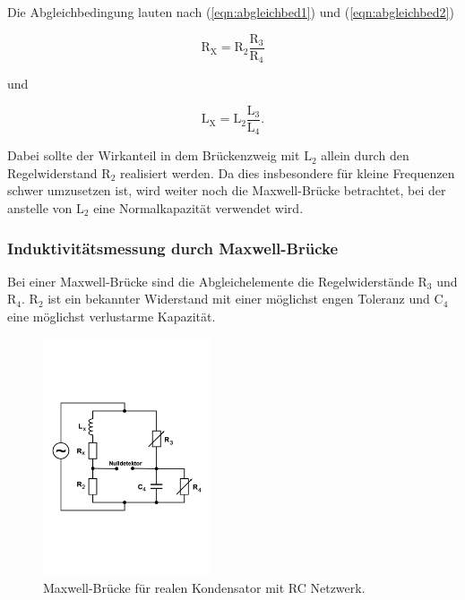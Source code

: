 \noindent
Die Abgleichbedingung lauten nach (\ref{eqn:abgleichbed1}) und (\ref{eqn:abgleichbed2})

\begin{equation}
\text{R}_\text{X} = \text{R}_2 \frac{\text{R}_3}{\text{R}_4}
\label{eqn:r_x}
\end{equation}

\noindent
und 

\begin{equation}
\text{L}_\text{X} = \text{L}_2 \frac{\text{L}_3}{\text{L}_4}  .
\label{eqn:l_x}
\end{equation}

\noindent
Dabei sollte der Wirkanteil in dem Brückenzweig mit $\text{L}_2$ allein durch den Regelwiderstand $\text{R}_2$ realisiert werden.
Da dies insbesondere für kleine Frequenzen schwer umzusetzen ist, wird weiter noch die Maxwell-Brücke betrachtet, 
bei der anstelle von $\text{L}_2$ eine Normalkapazität verwendet wird.

\subsubsection{Induktivitätsmessung durch Maxwell-Brücke}

\noindent
Bei einer Maxwell-Brücke sind die Abgleichelemente die Regelwiderstände $\text{R}_3$ und $\text{R}_4$.
$\text{R}_2$ ist ein bekannter Widerstand mit einer möglichst engen Toleranz und $\text{C}_4$ eine möglichst verlustarme Kapazität.

\begin{figure}
            \centering
               \includegraphics[height=7cm]{Bilder/maxwell.pdf}
               \caption{Maxwell-Brücke für realen Kondensator mit RC Netzwerk.}
               \label{fig:max}
        \end{figure}
 
